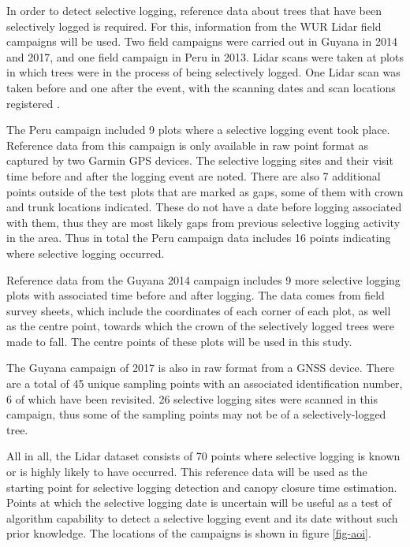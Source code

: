 \documentclass[a4paper,10pt]{article}
\begin{document}
In order to detect selective logging, reference data about trees that have been selectively logged is required. For this, information from the \ac{WUR} Lidar field campaigns will be used. Two field campaigns were carried out in Guyana in 2014 and 2017, and one field campaign in Peru in 2013. Lidar scans were taken at plots in which trees were in the process of being selectively logged. One Lidar scan was taken before and one after the event, with the scanning dates and scan locations registered \citep{gonzalez_de_tanago_estimation_2017}.

The Peru campaign included 9 plots where a selective logging event took place. Reference data from this campaign is only available in raw point format as captured by two Garmin \ac{GPS} devices. The selective logging sites and their visit time before and after the logging event are noted. There are also 7 additional points outside of the test plots that are marked as gaps, some of them with crown and trunk locations indicated. These do not have a date before logging associated with them, thus they are most likely gaps from previous selective logging activity in the area. Thus in total the Peru campaign data includes 16 points indicating where selective logging occurred.

Reference data from the Guyana 2014 campaign includes 9 more selective logging plots with associated time before and after logging. The data comes from field survey sheets, which include the coordinates of each corner of each plot, as well as the centre point, towards which the crown of the selectively logged trees were made to fall. The centre points of these plots will be used in this study.

The Guyana campaign of 2017 is also in raw format from a \ac{GNSS} device. There are a total of 45 unique sampling points with an associated identification number, 6 of which have been revisited. 26 selective logging sites were scanned in this campaign, thus some of the sampling points may not be of a selectively-logged tree.

All in all, the Lidar dataset consists of 70 points where selective logging is known or is highly likely to have occurred. This reference data will be used as the starting point for selective logging detection and canopy closure time estimation. Points at which the selective logging date is uncertain will be useful as a test of algorithm capability to detect a selective logging event and its date without such prior knowledge. The locations of the campaigns is shown in figure \ref{fig-aoi}.
\end{document}

